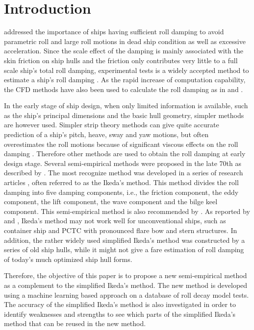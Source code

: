 \section{Introduction}
\label{se:introduction}
\parencite{imo_finalization_2016} addressed the importance of ships having sufficient roll damping to avoid parametric roll and large roll motions in dead ship condition as well as excessive acceleration. 
Since the scale effect of the damping is mainly associated with the skin friction on ship hulls and the friction only contributes very little to a full scale ship's total roll damping, experimental tests is a widely accepted method to estimate a ship's roll damping \parencite{imo_1200_2006}. As the rapid increase of computation capability, the CFD methods have also been used to calculate the roll damping as in \parencite{kristiansen_experimental_2014} and \parencite{henry_peter_piehl_ship_2016}. 

In the early stage of ship design, when only limited information is available, such as the ship's principal dimensions and the basic hull geometry, simpler methods are however used. Simpler strip theory methods can give quite accurate prediction of a ship's pitch, heave, sway and yaw motions, but often overestimates the roll motions because of significant viscous effects on the roll damping \parencite{kawahara_simple_2011}. Therefore other methods are used to obtain the roll damping at early design stage. Several semi-empirical methods were proposed in the late 70th as described by  \parencite{himeno_prediction_1981}. The most recognize method was developed in a series of research articles \parencite{ikeda_roll_1978,ikeda_eddy_1978,ikeda_roll_1979,ikeda_components_1978,ikeda_velocity_1979}, often referred to as the Ikeda's method. This method divides the roll damping into five damping components, i.e., the friction component, the eddy component, the lift component, the wave component and the bilge keel component. This semi-empirical method is also recommended by \parencite{ittc_ittc_2011}. As reported by  \parencite{kawahara_simple_2011} and \parencite{soder_ikeda_2019}, Ikeda's method may not work well for unconventional ships, such as container ship and PCTC with pronounced flare bow and stern structures. In addition, the rather widely used simplified Ikeda's method \parencite{kawahara_simple_2011} was constructed by a series of old ship hulls, while it might not give a fare estimation of roll damping of today's much optimized ship hull forms. 

Therefore, the objective of this paper is to propose a new semi-empirical method as a complement to the simplified Ikeda's method. The new method is developed using a machine learning based approach on a database of roll decay model tests. The accuracy of the simplified Ikeda's method is also investigated in order to identify weaknesses and strengths to see which parts of the simplified Ikeda's method that can be reused in the new method.  

